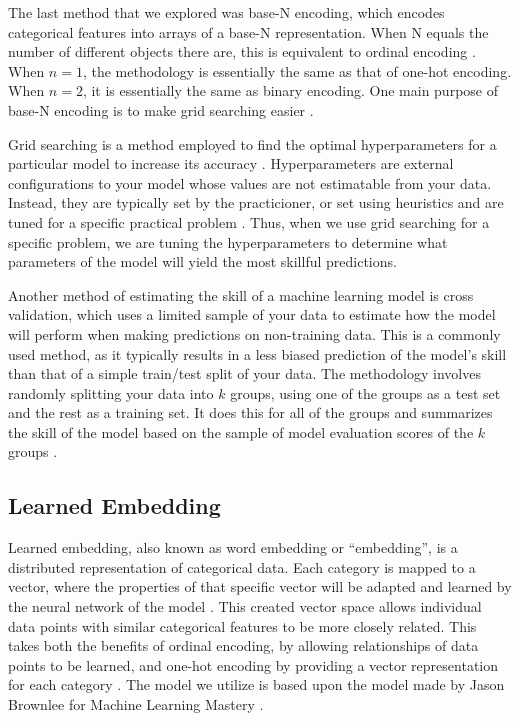 \documentclass[12pt,letterpaper]{article}
\theoremstyle{plain}
\theoremstyle{definition}
\begin{document}
The last method that we explored was base-N encoding, which encodes categorical features into arrays of a base-N representation. When N equals the number of different objects there are, this is equivalent to ordinal encoding \cite{scikit}. When $n=1$, the methodology is essentially the same as that of one-hot encoding. When $n=2$, it is essentially the same as binary encoding. One main purpose of base-N encoding is to make grid searching easier \cite{encodingcateg}.  

Grid searching is a method employed to find the optimal hyperparameters for a particular model to increase its accuracy \cite{gridsearch}. Hyperparameters are external configurations to your model whose values are not estimatable from your data. Instead, they are typically set by the practicioner, or set using heuristics and are tuned for a specific practical problem \cite{hyperparam}. Thus, when we use grid searching for a specific problem, we are tuning the hyperparameters to determine what parameters of the model will yield the most skillful predictions. 

Another method of estimating the skill of a machine learning model is cross validation, which uses a limited sample of your data to estimate how the model will perform when making predictions on non-training data. This is a commonly used method, as it typically results in a less biased prediction of the model's skill than that of a simple train/test split of your data. The methodology involves randomly splitting your data into $k$ groups, using one of the groups as a test set and the rest as a training set. It does this for all of the groups and summarizes the skill of the model based on the sample of model evaluation scores of the $k$ groups \cite{crossval}. 

\subsection{Learned Embedding}
\hspace{\parindent}Learned embedding, also known as word embedding or “embedding”, is a distributed representation of categorical data. Each category is mapped to a vector, where the properties of that specific vector will be adapted and learned by the neural network of the model \cite{3ways}. This created vector space allows individual data points with similar categorical features to be more closely related. This takes both the benefits of ordinal encoding, by allowing relationships of data points to be learned, and one-hot encoding by providing a vector representation for each category \cite{transferlearning}.  The model we utilize is based upon the model made by Jason Brownlee for Machine Learning Mastery \cite{3ways}.
\end{document}
